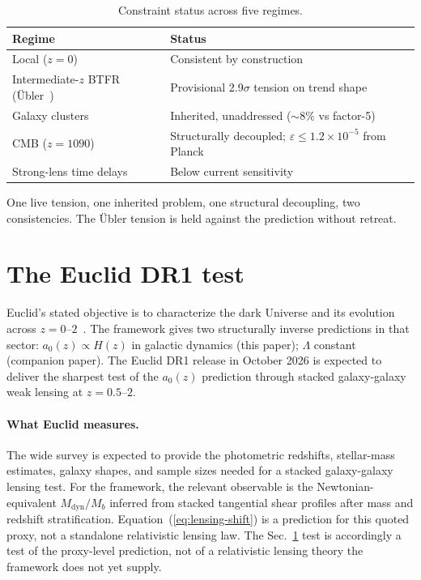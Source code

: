 \documentclass[
    aps,
    prd,
    reprint,
    superscriptaddress,
    nofootinbib,
    floatfix
]{revtex4-2}
\begin{document}
\begin{table}[tb]
\caption{\label{tab:constraints}Constraint status across five
regimes.}
\begin{ruledtabular}
\begin{tabular}{ll}
Regime & Status \\
\hline
Local ($z = 0$)
  & Consistent by construction \\
Intermediate-$z$ BTFR (\"Ubler~\cite{Ubler2017})
  & Provisional 2.9$\sigma$ tension on trend shape \\
Galaxy clusters~\cite{PointecouteauSilk2005}
  & Inherited, unaddressed ($\sim 8\%$ vs factor-5) \\
CMB ($z = 1090$)
  & Structurally decoupled; $\varepsilon \leq 1.2 \times 10^{-5}$ from Planck \\
Strong-lens time delays
  & Below current sensitivity \\
\end{tabular}
\end{ruledtabular}
\end{table}

One live tension, one inherited problem, one structural decoupling,
two consistencies. The \"Ubler tension is held against the prediction
without retreat.

\section{The Euclid DR1 test}
\label{sec:euclid}

Euclid's stated objective is to characterize the dark Universe and
its evolution across $z = 0\text{--}2$~\cite{Mellier2024}. The
framework gives two structurally inverse predictions in that sector:
$a_0(z) \propto H(z)$ in galactic dynamics (this paper); $\Lambda$
constant (companion paper). The Euclid DR1 release in October 2026
is expected to deliver the sharpest test of the $a_0(z)$ prediction
through stacked galaxy-galaxy weak lensing at $z = 0.5\text{--}2$.

\paragraph*{What Euclid measures.}
The wide survey is expected to provide the photometric redshifts,
stellar-mass estimates, galaxy shapes, and sample sizes needed for a
stacked galaxy-galaxy lensing test. For the framework, the relevant
observable is the Newtonian-equivalent $M_\text{dyn}/M_b$ inferred
from stacked tangential shear profiles after mass and redshift
stratification. Equation~(\ref{eq:lensing-shift}) is a prediction for
this quoted proxy, not a standalone relativistic lensing law. The
Sec.~\ref{sec:euclid} test is accordingly a test of the proxy-level
prediction, not of a relativistic lensing theory the framework does
not yet supply.
\end{document}

